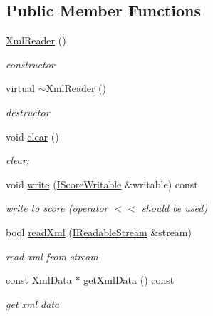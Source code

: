 \subsection*{\-Public \-Member \-Functions}
\begin{DoxyCompactItemize}
\item 
\hypertarget{classsinsy_1_1XmlReader_adac676393e3a2500ccd901b6c4283962}{\hyperlink{classsinsy_1_1XmlReader_adac676393e3a2500ccd901b6c4283962}{\-Xml\-Reader} ()}\label{classsinsy_1_1XmlReader_adac676393e3a2500ccd901b6c4283962}

\begin{DoxyCompactList}\small\item\em constructor \end{DoxyCompactList}\item 
\hypertarget{classsinsy_1_1XmlReader_a8903e46b5682f43a291617886a9b1fbf}{virtual \hyperlink{classsinsy_1_1XmlReader_a8903e46b5682f43a291617886a9b1fbf}{$\sim$\-Xml\-Reader} ()}\label{classsinsy_1_1XmlReader_a8903e46b5682f43a291617886a9b1fbf}

\begin{DoxyCompactList}\small\item\em destructor \end{DoxyCompactList}\item 
void \hyperlink{classsinsy_1_1XmlReader_a6758ead0eea59bf9babf340f2a2aea83}{clear} ()
\begin{DoxyCompactList}\small\item\em clear; \end{DoxyCompactList}\item 
void \hyperlink{classsinsy_1_1XmlReader_acf02eb4794dfbad6e1b71d5cd7221a52}{write} (\hyperlink{classsinsy_1_1IScoreWritable}{\-I\-Score\-Writable} \&writable) const 
\begin{DoxyCompactList}\small\item\em write to score (operator $<$$<$ should be used) \end{DoxyCompactList}\item 
bool \hyperlink{classsinsy_1_1XmlReader_a0b08ba6f27e900555de9173872882fa2}{read\-Xml} (\hyperlink{classsinsy_1_1IReadableStream}{\-I\-Readable\-Stream} \&stream)
\begin{DoxyCompactList}\small\item\em read xml from stream \end{DoxyCompactList}\item 
\hypertarget{classsinsy_1_1XmlReader_adcda3d45e5ac86d336b3b2cf44cfc60e}{const \hyperlink{classsinsy_1_1XmlData}{\-Xml\-Data} $\ast$ \hyperlink{classsinsy_1_1XmlReader_adcda3d45e5ac86d336b3b2cf44cfc60e}{get\-Xml\-Data} () const }\label{classsinsy_1_1XmlReader_adcda3d45e5ac86d336b3b2cf44cfc60e}

\begin{DoxyCompactList}\small\item\em get xml data \end{DoxyCompactList}\end{DoxyCompactItemize}


